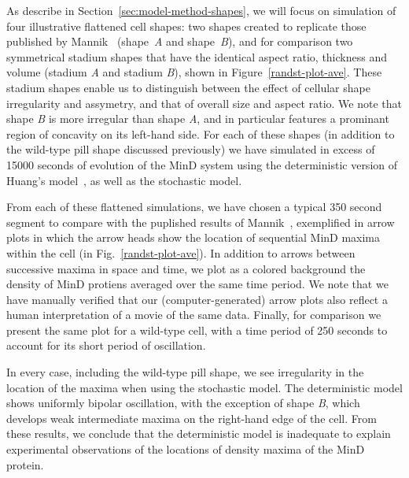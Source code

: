 \documentclass[letterpaper,twocolumn,amsmath,amssymb,pre]{revtex4-1}
\newcommand{\red}[1]{{\bf \color{red} #1}}
\newcommand{\fixme}[1]{\red{[#1]}}
\begin{document}
As describe in Section~\ref{sec:model-method-shapes}, we will focus on
simulation of four illustrative flattened cell shapes: two shapes
created to replicate those published by
Mannik~\cite{mannik2012robustness} (shape~\emph{A} and
shape~\emph{B}), and for comparison two symmetrical stadium shapes
that have the identical aspect ratio, thickness and volume (stadium
\emph{A} and stadium \emph{B}), shown in Figure~\ref{randst-plot-ave}.
These stadium shapes enable us to distinguish between the effect of
cellular shape irregularity and assymetry, and that of overall size
and aspect ratio.  We note that shape \emph{B} is more irregular than
shape \emph{A}, and in particular features a prominant region of
concavity on its left-hand side.  For each of these shapes (in
addition to the wild-type pill shape discussed previously) we have
simulated in excess of 15000 seconds of evolution of the MinD
system using the deterministic version of Huang's
model~\cite{huang2003dynamic}, as well as the stochastic model.

From each of these flattened simulations, we have chosen a typical 350
second segment to compare with the puplished results of
Mannik~\cite{mannik2012robustness}, exemplified in arrow plots in
which the arrow heads show the location of sequential MinD maxima
within the cell (in Fig.~\ref{randst-plot-ave}).  In addition to
arrows between successive maxima in space and time, we plot as a
colored background the density of MinD protiens averaged over the same
time period.  We note that we have manually verified that our
(computer-generated) arrow plots also reflect a human interpretation
of a movie of the same data.  Finally, for comparison we present the
same plot for a wild-type cell, with a time period of 250 seconds to
account for its short period of oscillation.

In every case, including the wild-type pill shape, we see irregularity
in the location of the maxima when using the stochastic model.  The
deterministic model shows uniformly bipolar oscillation, with the
exception of shape \emph{B}, which develops weak intermediate maxima
on the right-hand edge of the cell.  From these results, we conclude
that the deterministic model is inadequate to explain experimental
observations of the locations of density maxima of the MinD protein.


\end{document}
